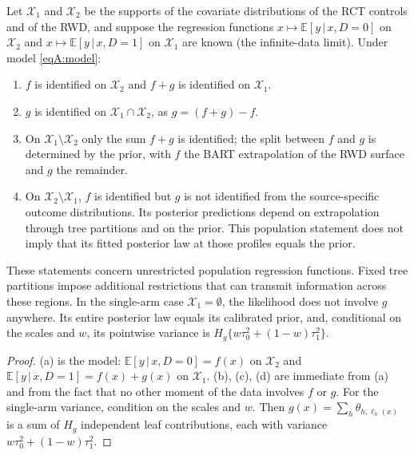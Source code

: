 \documentclass[11pt]{article}
\newcommand{\E}{\mathbb{E}}
\newcommand{\given}{\,\vert\,}
\theoremstyle{definition}
\theoremstyle{plain}
\begin{document}
{\begin{propA}\label{prop:ident}
Let $\mathcal X_1$ and $\mathcal X_2$ be the supports of the covariate distributions of the RCT controls and of the RWD, and suppose the regression functions $x\mapsto\E[y\given x,D=0]$ on $\mathcal X_2$ and $x\mapsto\E[y\given x,D=1]$ on $\mathcal X_1$ are known (the infinite-data limit). Under model \eqref{eqA:model}:
\begin{enumerate}[label=(\alph*),leftmargin=2.2em]
\item $f$ is identified on $\mathcal X_2$ and $f+g$ is identified on $\mathcal X_1$.
\item $g$ is identified on $\mathcal X_1\cap\mathcal X_2$, as $g=(f+g)-f$.
\item On $\mathcal X_1\setminus\mathcal X_2$ only the sum $f+g$ is identified; the split between $f$ and $g$ is determined by the prior, with $f$ the BART extrapolation of the RWD surface and $g$ the remainder.
\item On $\mathcal X_2\setminus\mathcal X_1$, $f$ is identified but $g$ is not identified from the source-specific outcome distributions. Its posterior predictions depend on extrapolation through tree partitions and on the prior. This population statement does not imply that its fitted posterior law at those profiles equals the prior.
\end{enumerate}
These statements concern unrestricted population regression functions. Fixed tree partitions impose additional restrictions that can transmit information across these regions. In the single-arm case $\mathcal X_1=\emptyset$, the likelihood does not involve $g$ anywhere. Its entire posterior law equals its calibrated prior, and, conditional on the scales and $w$, its pointwise variance is $H_g\{w\tau_0^2+(1-w)\tau_1^2\}$.
\end{propA}

\begin{proof}
(a) is the model: $\E[y\given x,D=0]=f(x)$ on $\mathcal X_2$ and $\E[y\given x,D=1]=f(x)+g(x)$ on $\mathcal X_1$. (b), (c), (d) are immediate from (a) and from the fact that no other moment of the data involves $f$ or $g$. For the single-arm variance, condition on the scales and $w$. Then $g(x)=\sum_h\theta_{h,\ell_h(x)}$ is a sum of $H_g$ independent leaf contributions, each with variance $w\tau_0^2+(1-w)\tau_1^2$.
\end{proof}

}
\end{document}
